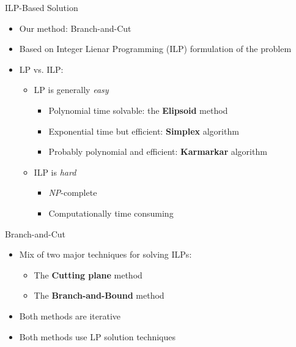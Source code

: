 \documentclass[10pt]{beamer}
\begin{document}
\begin{frame}{ILP-Based Solution}
    \begin{itemize}
        \item<1-> Our method: Branch-and-Cut
        \item<2-> Based on Integer Lienar Programming (ILP) formulation of the problem
        \item<3-> LP vs. ILP:
            \begin{itemize}
                \item<4-> LP is generally \emph{easy}
                    \begin{itemize}
                        \item<5-> Polynomial time solvable: the \textbf{Elipsoid} method
                        \item<6-> Exponential time but efficient: \textbf{Simplex} algorithm
                        \item<7-> Probably polynomial and efficient: \textbf{Karmarkar} algorithm
                    \end{itemize}
                \item<8-> ILP is \emph{hard}
                    \begin{itemize}
                        \item<9-> \emph{NP}-complete
                        \item<10-> Computationally time consuming
                    \end{itemize}
            \end{itemize}
    \end{itemize}
\end{frame}

\begin{frame}{Branch-and-Cut}
    \begin{itemize}
        \item<1-> Mix of two major techniques for solving ILPs:
            \begin{itemize}
                \item<2-> The \textbf{Cutting plane} method                
                \item<3-> The \textbf{Branch-and-Bound} method                
            \end{itemize}
        \item<4-> Both methods are iterative
        \item<5-> Both methods use LP solution techniques
    \end{itemize}
\end{frame}
\end{document}
